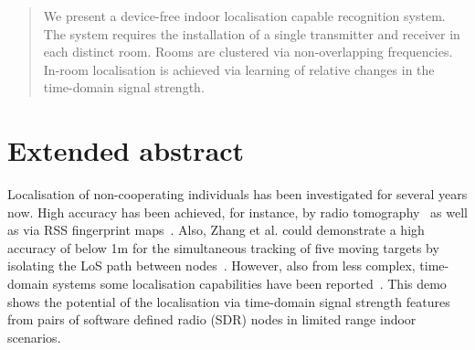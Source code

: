 \documentclass{sig-alternate-ipsn13}
\begin{document}
\maketitle
\begin{abstract}
We present a device-free indoor localisation capable recognition system.
The system requires the installation of a single transmitter and receiver in each distinct room.
Rooms are clustered via non-overlapping frequencies. 
In-room localisation is achieved via learning of relative changes in the time-domain signal strength.
\end{abstract}


 \section{Extended abstract}
Localisation of non-cooperating individuals has been investigated for several years now.
High accuracy has been achieved, for instance, by radio tomography~\cite{RFSensing_Wilson_2009} as well as via RSS fingerprint maps~\cite{Pervasive_Seifeldin_2013}. 
Also, Zhang et al. could demonstrate a high accuracy of below 1m for the simultaneous tracking of five moving targets by isolating the LoS path between nodes~\cite{Pervasive_Zhang_2012}.
However, also from less complex, time-domain systems some localisation capabilities have been reported~\cite{Pervasive_Sigg_2012}.
This demo shows the potential of the localisation via time-domain signal strength features from pairs of software defined radio (SDR) nodes in limited range indoor scenarios.
\end{document}
